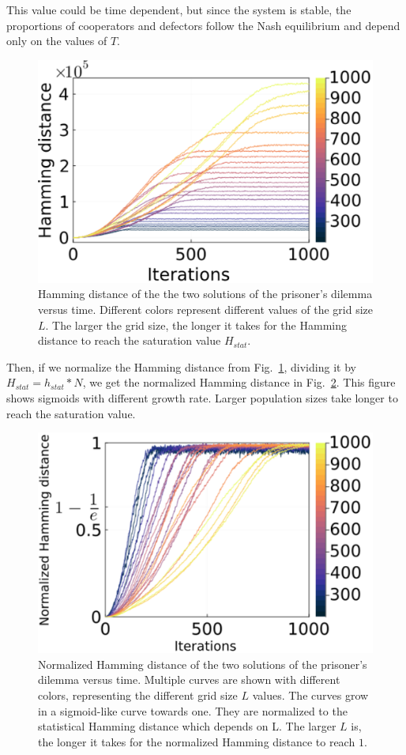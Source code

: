 This value could be time dependent, but since the system is stable, the proportions of cooperators and defectors follow the Nash equilibrium and depend only on the values of $T$.



\begin{figure}
	\centering
	\includegraphics[width=0.8\linewidth]{Images/P3/HammingTimePopulation_PD.eps}
	\caption{Hamming distance of the the two solutions of the prisoner's dilemma versus time. Different colors represent different values of the grid size $L$. The larger the grid size, the longer it takes for the Hamming distance to reach the saturation value $H_{stat}$.}
	\label{fig:HammingTimePopulation_PD}
\end{figure}






Then, if we normalize the Hamming distance from Fig.~\ref{fig:HammingTimePopulation_PD}, dividing it by $H_{stat} = h_{stat}*N$, we get the normalized Hamming distance in Fig.~\ref{fig:NormalHammingTimePopulation_PD}. This figure shows sigmoids with different growth rate. Larger population sizes take longer to reach the saturation value.



\begin{figure}
	\centering
	\includegraphics[width=0.8\linewidth]{Images/P3/NormalHammingTimePopulation_PD.eps}
	\caption{ Normalized Hamming distance of the two solutions of the prisoner's dilemma versus time. Multiple curves are shown with different colors, representing the different grid size $L$ values. The curves grow in a sigmoid-like curve towards one. They are normalized to the statistical Hamming distance which depends on L. The larger $L$ is, the longer it takes for the normalized Hamming distance to reach $1$.}
	\label{fig:NormalHammingTimePopulation_PD}
\end{figure}


